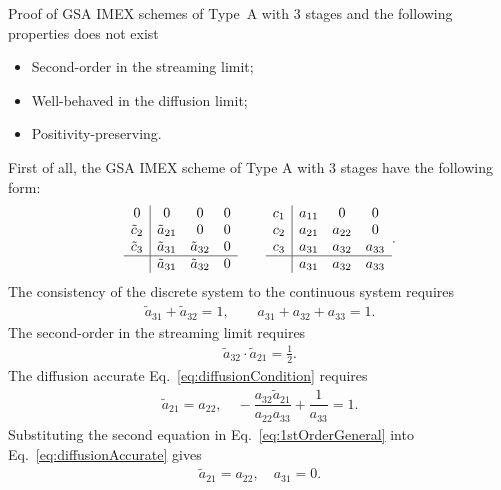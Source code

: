 Proof of GSA IMEX schemes of Type~A with 3 stages and the following properties does not exist
\begin{itemize}
  \item Second-order in the streaming limit;
  \item Well-behaved in the diffusion limit;
  \item Positivity-preserving.
\end{itemize}
First of all, the GSA IMEX scheme of Type A with 3 stages have the following form:
\begin{equation*}
  \begin{array}{c | c c c}
  	      0       & 0              & 0              & 0 \\
  	\tilde{c}_{2} & \tilde{a}_{21} & 0              & 0 \\
  	\tilde{c}_{3} & \tilde{a}_{31} & \tilde{a}_{32} & 0 \\ \hline
  	              & \tilde{a}_{31} & \tilde{a}_{32} & 0
  \end{array}
  \qquad
  \begin{array}{c | c c c}
    c_{1} & a_{11} & 0      & 0      \\
  	c_{2} & a_{21} & a_{22} & 0      \\
  	c_{3} & a_{31} & a_{32} & a_{33} \\ \hline
  	      & a_{31} & a_{32} & a_{33}
  \end{array}.
\end{equation*}
The consistency of the discrete system to the continuous system requires
\begin{align}
 \tilde{a}_{31} + \tilde{a}_{32} = 1, \quad \quad a_{31} + a_{32} + a_{33} = 1.
 \label{eq:1stOrderGeneral}
\end{align}
The second-order in the streaming limit requires
\begin{align}
\tilde{a}_{32}\cdot \tilde{a}_{21} =  \frac{1}{2}.
\end{align}
The diffusion accurate Eq.~\eqref{eq:diffusionCondition} requires 
\begin{align}
\tilde{a}_{21} = a_{22}, \quad -\dfrac{a_{32} \tilde{a}_{21}}{a_{22}a_{33}} + \dfrac{1}{a_{33}} =1.
\label{eq:diffusionAccurate}
\end{align}
Substituting the second equation in Eq.~\eqref{eq:1stOrderGeneral} into Eq.~\eqref{eq:diffusionAccurate} gives
\begin{align}
\tilde{a}_{21} = a_{22}, \quad a_{31} = 0.
\label{eq:a31is0}
\end{align}
